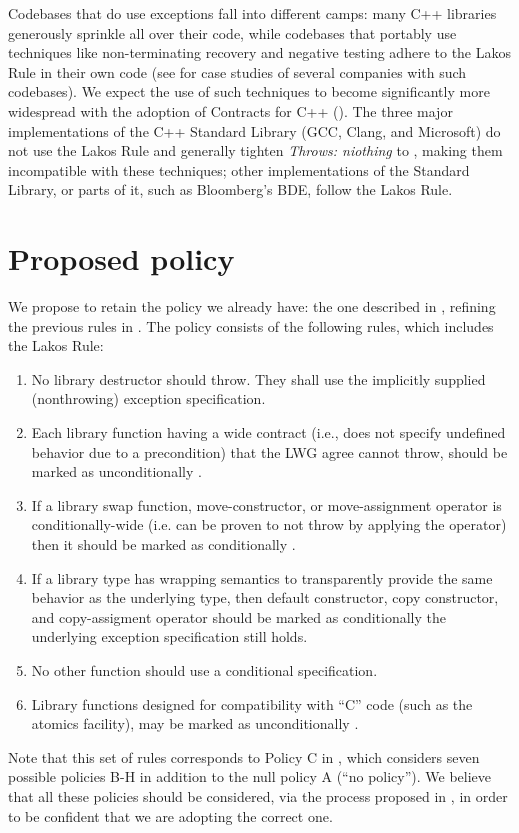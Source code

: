 Codebases that do use exceptions fall into different camps: many C++ libraries generously sprinkle  all over their code, while codebases that portably use techniques like non-terminating recovery and negative testing adhere to the Lakos Rule in their own code (see \cite{P2831R0} for case studies of several companies with such codebases). We expect the use of such techniques to become significantly more widespread with the adoption of Contracts for C++ (\cite{P2900R5}). The three major implementations of the C++ Standard Library (GCC, Clang, and Microsoft) do not use the Lakos Rule and generally tighten \emph{Throws: niothing} to , making them incompatible with these techniques; other implementations of the Standard Library, or parts of it, such as Bloomberg's BDE, follow the Lakos Rule.


\section{Proposed policy}
\label{sec:policy}

We propose to retain the policy we already have: the one described in \cite{P0884R0}, refining the previous rules in \cite{N3279}. The policy consists of the following rules, which includes the Lakos Rule:
\begin{enumerate}[label=\alph*)]
\item No library destructor should throw. They shall use the implicitly supplied (nonthrowing)
exception specification.
\item Each library function having a wide contract (i.e., does not specify undefined behavior
due to a precondition) that the LWG agree cannot throw, should be marked as
unconditionally .
\item If a library swap function, move-constructor, or move-assignment operator is
conditionally-wide (i.e. can be proven to not throw by applying the  operator)
then it should be marked as conditionally .
\item If a library type has wrapping semantics to transparently provide the same behavior as
the underlying type, then default constructor, copy constructor, and copy-assigment
operator should be marked as conditionally  the underlying exception
specification still holds.
\item No other function should use a conditional  specification.
\item Library functions designed for compatibility with “C” code (such as the atomics facility),
may be marked as unconditionally . 
\end{enumerate}
Note that this set of rules corresponds to Policy C in \cite{P3005R0}, which considers seven possible  policies B-H in addition to the null policy A (``no policy''). We believe that all these policies should be considered, via the process proposed in \cite{P3005R0}, in order to be confident that we are adopting the correct one.

